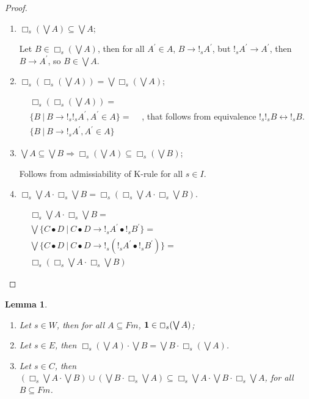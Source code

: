 \documentclass[a4paper]{article}
\newtheorem{lemma}{Lemma}
\begin{document}
\begin{proof}
$ $

\begin{enumerate}
  \item $\Box_s (\bigvee A) \subseteq \bigvee A$;

Let $B \in \Box_s (\bigvee A)$, then for all $A^{'} \in A$, $B \rightarrow !_s A^{'}$,
but $!_s A^{'} \rightarrow A^{'}$, then $B \rightarrow A^{'}$, so $B \in \bigvee A$.

\item $\Box_s (\Box_s(\bigvee A)) = \bigvee \Box_s (\bigvee A)$;

$\begin{array}{lll}
& \Box_s (\Box_s(\bigvee A)) = & \\
& \{ B \: | \: B \rightarrow !_s !_s A^{'}, A^{'} \in A \} = & \\
& \{ B \: | \: B \rightarrow !_s A^{'}, A^{'} \in A \} &
\end{array}$,
that follows from equivalence $!_s !_s B \leftrightarrow !_s B$.

\item $\bigvee A \subseteq \bigvee B \Rightarrow \Box_s (\bigvee A) \subseteq \Box_s (\bigvee B)$;

Follows from admissiability of K-rule for all $s \in I$.

\item $\Box_s \bigvee A \cdot \Box_s \bigvee B = \Box_s (\Box_s \bigvee A \cdot \Box_s \bigvee B)$.

$\begin{array}{lll}
&\Box_s \bigvee A \cdot \Box_s \bigvee B = & \\
&\bigvee \{ C \bullet D \: | \: C \bullet D \rightarrow !_s A^{'} \bullet !_s B^{'} \} = & \\
&\bigvee \{ C \bullet D \: | \: C \bullet D \rightarrow !_s (!_s A^{'} \bullet !_s B^{'})\} = & \\
&\Box_s (\Box_s \bigvee A \cdot \Box_s \bigvee B)&
\end{array}$

\end{enumerate}
\end{proof}

\begin{lemma}
$ $

  \begin{enumerate}
    \item Let $s \in W$, then for all $A \subseteq Fm$, ${\bf 1} \in \Box_s (\bigvee A)$;
    \item Let $s \in E$, then $\Box_s (\bigvee A) \cdot \bigvee B = \bigvee B \cdot \Box_s (\bigvee A)$.
    \item Let $s \in C$, then $(\Box_s \bigvee A \cdot \bigvee B) \cup (\bigvee B \cdot \Box_s \bigvee A) \subseteq \Box_s \bigvee A \cdot \bigvee B \cdot \Box_s \bigvee A$, for all $B \subseteq Fm$.
  \end{enumerate}
\end{lemma}
\end{document}
